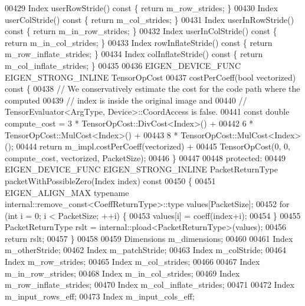 \begin{DoxyCode}
00429   Index userRowStride()\textcolor{keyword}{ const }\{ \textcolor{keywordflow}{return} m\_row\_strides; \}
00430   Index userColStride()\textcolor{keyword}{ const }\{ \textcolor{keywordflow}{return} m\_col\_strides; \}
00431   Index userInRowStride()\textcolor{keyword}{ const }\{ \textcolor{keywordflow}{return} m\_in\_row\_strides; \}
00432   Index userInColStride()\textcolor{keyword}{ const }\{ \textcolor{keywordflow}{return} m\_in\_col\_strides; \}
00433   Index rowInflateStride()\textcolor{keyword}{ const }\{ \textcolor{keywordflow}{return} m\_row\_inflate\_strides; \}
00434   Index colInflateStride()\textcolor{keyword}{ const }\{ \textcolor{keywordflow}{return} m\_col\_inflate\_strides; \}
00435 
00436   EIGEN\_DEVICE\_FUNC EIGEN\_STRONG\_INLINE TensorOpCost
00437   costPerCoeff(\textcolor{keywordtype}{bool} vectorized)\textcolor{keyword}{ const }\{
00438     \textcolor{comment}{// We conservatively estimate the cost for the code path where the computed}
00439     \textcolor{comment}{// index is inside the original image and}
00440     \textcolor{comment}{// TensorEvaluator<ArgType, Device>::CoordAccess is false.}
00441     \textcolor{keyword}{const} \textcolor{keywordtype}{double} compute\_cost = 3 * TensorOpCost::DivCost<Index>() +
00442                                 6 * TensorOpCost::MulCost<Index>() +
00443                                 8 * TensorOpCost::MulCost<Index>();
00444     \textcolor{keywordflow}{return} m\_impl.costPerCoeff(vectorized) +
00445            TensorOpCost(0, 0, compute\_cost, vectorized, PacketSize);
00446   \}
00447 
00448  \textcolor{keyword}{protected}:
00449   EIGEN\_DEVICE\_FUNC EIGEN\_STRONG\_INLINE PacketReturnType packetWithPossibleZero(Index index)\textcolor{keyword}{ const}
00450 \textcolor{keyword}{  }\{
00451     EIGEN\_ALIGN\_MAX \textcolor{keyword}{typename} internal::remove\_const<CoeffReturnType>::type values[PacketSize];
00452     \textcolor{keywordflow}{for} (\textcolor{keywordtype}{int} i = 0; i < PacketSize; ++i) \{
00453       values[i] = coeff(index+i);
00454     \}
00455     PacketReturnType rslt = internal::pload<PacketReturnType>(values);
00456     \textcolor{keywordflow}{return} rslt;
00457   \}
00458 
00459   Dimensions m\_dimensions;
00460 
00461   Index m\_otherStride;
00462   Index m\_patchStride;
00463   Index m\_colStride;
00464   Index m\_row\_strides;
00465   Index m\_col\_strides;
00466 
00467   Index m\_in\_row\_strides;
00468   Index m\_in\_col\_strides;
00469   Index m\_row\_inflate\_strides;
00470   Index m\_col\_inflate\_strides;
00471 
00472   Index m\_input\_rows\_eff;
00473   Index m\_input\_cols\_eff;

\end{DoxyCode}
